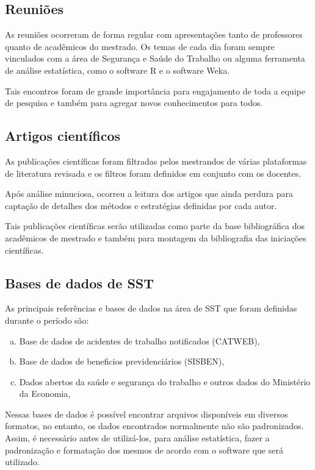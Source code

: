 \documentclass{article}
\begin{document}
\subsection{Reuniões}

As reuniões ocorreram de forma regular com apresentações tanto de professores quanto de acadêmicos do mestrado. Os temas de cada dia foram sempre vinculados com a área de Segurança e Saúde do Trabalho ou alguma ferramenta de análise estatística, como o software R e o software Weka. 

Tais encontros foram de grande importância para engajamento de toda a equipe de pesquisa e também para agregar novos conhecimentos para todos. 

\subsection{Artigos científicos}

As publicações científicas foram filtradas pelos mestrandos de várias plataformas de literatura revisada e os filtros foram definidos em conjunto com os docentes. 

Após análise minuciosa, ocorreu a leitura dos artigos que ainda perdura para captação de detalhes dos métodos e estratégias definidas por cada autor. 

Tais publicações científicas serão utilizadas como parte da base bibliográfica dos acadêmicos de mestrado e também para montagem da bibliografia das iniciações científicas.

\subsection{Bases de dados de SST}


As principais referências e bases de dados na área de SST que foram definidas durante o período são: 

\begin{enumerate}[a)]

\item Base de dados de acidentes de trabalho notificados (CATWEB), 
\item Base de dados de beneficios previdenciários (SISBEN), 
\item Dados abertos da saúde e segurança do trabalho e outros dados do Ministério da Economia,

\end{enumerate}

Nessas bases de dados é possível encontrar arquivos disponíveis em diversos formatos, no entanto, os dados encontrados normalmente não são padronizados. Assim, é necessário antes de utilizá-los, para análise estatística, fazer a padronização e formatação dos mesmos de acordo com o software que será utilizado.
\end{document}

